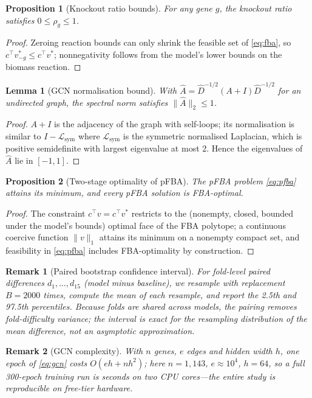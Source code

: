 \documentclass[12pt]{article}
\newtheorem{proposition}{Proposition}
\newtheorem{lemma}{Lemma}
\newtheorem{remark}{Remark}
\begin{document}
\begin{proposition}[Knockout ratio bounds]
For any gene $g$, the knockout ratio satisfies
$0 \le \rho_g \le 1$.
\end{proposition}
\begin{proof}
Zeroing reaction bounds can only shrink the feasible set of \eqref{eq:fba},
so $c^{\top}v^{*}_{-g}\le c^{\top}v^{*}$; nonnegativity follows from the
model's lower bounds on the biomass reaction.
\end{proof}

\begin{lemma}[GCN normalisation bound]
With $\hat{A}=\hat{D}^{-1/2}(A+I)\hat{D}^{-1/2}$ for an undirected graph,
the spectral norm satisfies $\lVert \hat{A}\rVert_2 \le 1$.
\end{lemma}
\begin{proof}
$A+I$ is the adjacency of the graph with self-loops; its normalisation is
similar to $I - \mathcal{L}_{\mathrm{sym}}$ where
$\mathcal{L}_{\mathrm{sym}}$ is the symmetric normalised Laplacian, which
is positive semidefinite with largest eigenvalue at most 2. Hence the
eigenvalues of $\hat{A}$ lie in $[-1,1]$.
\end{proof}

\begin{proposition}[Two-stage optimality of pFBA]
The pFBA problem \eqref{eq:pfba} attains its minimum, and every pFBA
solution is FBA-optimal.
\end{proposition}
\begin{proof}
The constraint $c^{\top}v = c^{\top}v^{*}$ restricts to the (nonempty,
closed, bounded under the model's bounds) optimal face of the FBA
polytope; a continuous coercive function $\lVert v\rVert_1$ attains its
minimum on a nonempty compact set, and feasibility in \eqref{eq:pfba}
includes FBA-optimality by construction.
\end{proof}

\begin{remark}[Paired bootstrap confidence interval]
For fold-level paired differences $d_1,\dots,d_{15}$ (model minus
baseline), we resample with replacement $B=2000$ times, compute the mean
of each resample, and report the 2.5th and 97.5th percentiles. Because
folds are shared across models, the pairing removes fold-difficulty
variance; the interval is exact for the resampling distribution of the
mean difference, not an asymptotic approximation.
\end{remark}

\begin{remark}[GCN complexity]
With $n$ genes, $e$ edges and hidden width $h$, one epoch of
\eqref{eq:gcn} costs $O(eh + nh^2)$; here $n=1{,}143$, $e\approx 10^4$,
$h=64$, so a full 300-epoch training run is seconds on two CPU cores---the
entire study is reproducible on free-tier hardware.
\end{remark}
\end{document}

